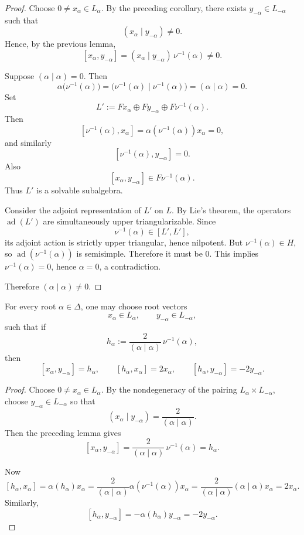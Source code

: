 \begin{proof}
    Choose $0\neq x_\alpha\in L_\alpha$. By the preceding corollary, there exists
    $y_{-\alpha}\in L_{-\alpha}$ such that
    \[
        (x_\alpha\mid y_{-\alpha})\neq 0.
    \]
    Hence, by the previous lemma,
    \[
        [x_\alpha,y_{-\alpha}]
        =
        (x_\alpha\mid y_{-\alpha})\,\nu^{-1}(\alpha)\neq 0.
    \]

    Suppose $(\alpha\mid\alpha)=0$. Then
    \[
        \alpha\bigl(\nu^{-1}(\alpha)\bigr)
        =
        \bigl(\nu^{-1}(\alpha)\mid \nu^{-1}(\alpha)\bigr)
        =
        (\alpha\mid\alpha)
        =
        0.
    \]
    Set
    \[
        L' := Fx_\alpha \oplus Fy_{-\alpha}\oplus F\nu^{-1}(\alpha).
    \]
    Then
    \[
        [\nu^{-1}(\alpha),x_\alpha]
        =
        \alpha(\nu^{-1}(\alpha))x_\alpha
        =
        0,
    \]
    and similarly
    \[
        [\nu^{-1}(\alpha),y_{-\alpha}]=0.
    \]
    Also
    \[
        [x_\alpha,y_{-\alpha}]
        \in F\nu^{-1}(\alpha).
    \]
    Thus $L'$ is a solvable subalgebra.

    Consider the adjoint representation of $L'$ on $L$. By Lie's theorem,
    the operators $\operatorname{ad}(L')$ are simultaneously upper triangularizable.
    Since
    \[
        \nu^{-1}(\alpha)\in [L',L'],
    \]
    its adjoint action is strictly upper triangular, hence nilpotent.
    But $\nu^{-1}(\alpha)\in H$, so $\operatorname{ad}(\nu^{-1}(\alpha))$ is semisimple.
    Therefore it must be $0$. This implies $\nu^{-1}(\alpha)=0$, hence $\alpha=0$,
    a contradiction.

    Therefore $(\alpha\mid\alpha)\neq 0$.
\end{proof}

\begin{proposition}
    For every root $\alpha\in\Delta$, one may choose root vectors
    \[
        x_\alpha\in L_\alpha,
        \qquad
        y_{-\alpha}\in L_{-\alpha},
    \]
    such that if
    \[
        h_\alpha := \frac{2}{(\alpha\mid\alpha)}\,\nu^{-1}(\alpha),
    \]
    then
    \[
        [x_\alpha,y_{-\alpha}]=h_\alpha,
        \qquad
        [h_\alpha,x_\alpha]=2x_\alpha,
        \qquad
        [h_\alpha,y_{-\alpha}]=-2y_{-\alpha}.
    \]
\end{proposition}

\begin{proof}
    Choose $0\neq x_\alpha\in L_\alpha$. By the nondegeneracy of the pairing
    $L_\alpha\times L_{-\alpha}$, choose $y_{-\alpha}\in L_{-\alpha}$ so that
    \[
        (x_\alpha\mid y_{-\alpha})=\frac{2}{(\alpha\mid\alpha)}.
    \]
    Then the preceding lemma gives
    \[
        [x_\alpha,y_{-\alpha}]
        =
        \frac{2}{(\alpha\mid\alpha)}\,\nu^{-1}(\alpha)
        =
        h_\alpha.
    \]

    Now
    \[
        [h_\alpha,x_\alpha]
        =
        \alpha(h_\alpha)x_\alpha
        =
        \frac{2}{(\alpha\mid\alpha)}
        \alpha(\nu^{-1}(\alpha))x_\alpha
        =
        \frac{2}{(\alpha\mid\alpha)}(\alpha\mid\alpha)x_\alpha
        =
        2x_\alpha.
    \]
    Similarly,
    \[
        [h_\alpha,y_{-\alpha}]
        =
        -\alpha(h_\alpha)y_{-\alpha}
        =
        -2y_{-\alpha}.
    \]
\end{proof}

